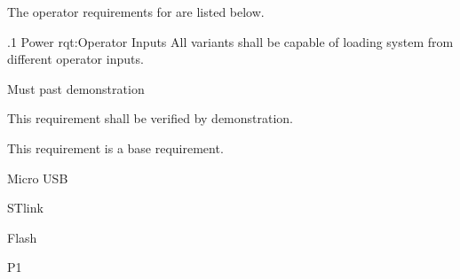 The operator requirements for \ThisSystem are listed below.

\ONERQMTVKPP
{\RqtNumberBase.1}
{Power}
{rqt:Operator Inputs}
{All \ThisSys variants shall be capable of loading system from different operator inputs.}
{
	\item [Phase 1] Must past demonstration
}
{This requirement shall be verified by demonstration.}
{
	\item [N/A] This requirement is a base requirement.
}
{
  \item Micro USB 
  \item STlink
  \item Flash
}
{P1}
